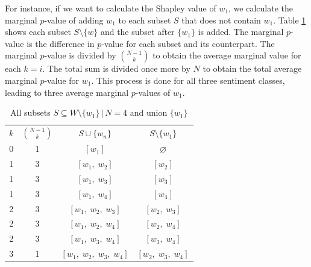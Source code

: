 For instance, if we want to calculate the Shapley value of $w_1$, we calculate the marginal $p$-value of adding $w_1$ to each subset $S$ that does not contain $w_1$. Table \ref{tab:shapley_w1} shows each subset $S \setminus \{w\}$ and the subset after $\{w_1\}$ is added. The marginal $p$-value is the difference in $p$-value for each subset and its counterpart. The marginal $p$-value is divided by $\binom{N-1}{k}$ to obtain the average marginal value for each $k=i$. The total sum is divided once more by $N$ to obtain the total average marginal $p$-value for $w_1$. This process is done for all three sentiment classes, leading to three average marginal $p$-values of $w_1$.

\begin{table}[h]
\caption{All subsets $S \subseteq W \setminus \{w_1\} \,|\,N=4$ and union $\{w_1\}$}
\centering
\begin{tabular}{c c c c}
$k$ & $\binom{N-1}{k}$ &$S \cup \{w_n\}$ & $S \setminus \{w_1\}$ \\ 
\cmidrule(lr){1-2} \cmidrule(lr){3-3} \cmidrule(lr){4-4} 
0   &   1   &   $[w_1]$                         &   $\varnothing$           \\
1   &   3   &   $[w_1,\; w_2]$                  &   $[w_2]$                 \\
1   &   3   &   $[w_1,\; w_3]$                  &   $[w_3]$                 \\
1   &   3   &   $[w_1,\; w_4]$                  &   $[w_4]$                 \\
2   &   3   &   $[w_1,\; w_2,\; w_3]$           &   $[w_2,\; w_3]$          \\
2   &   3   &   $[w_1,\; w_2,\; w_4]$           &   $[w_2,\; w_4]$          \\
2   &   3   &   $[w_1,\; w_3,\; w_4]$           &   $[w_3,\; w_4]$          \\
3   &   1   &   $[w_1,\; w_2,\; w_3,\; w_4]$    &   $[w_2,\; w_3,\; w_4]$   \\
\bottomrule
\end{tabular}
\label{tab:shapley_w1}
\end{table}

